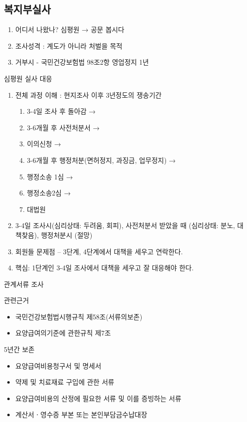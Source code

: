 \subsection{복지부실사}
\begin{enumerate}[1.]\tightlist
\item 어디서  나왔나?  심평원 → 공문 봅시다
\item 조사성격 : 계도가 아니라 처벌을 목적
\item 거부시 -  국민건강보험법 98조2항   영업정지 1년
\end{enumerate}
심평원 실사 대응
\begin{enumerate}[1.]\tightlist
\item 전체 과정 이해 : 현지조사 이후 3년정도의 쟁송기간
	\begin{enumerate}[⓵]\tightlist
	\item 3-4일 조사 후 돌아감 →
	\item 3-6개월 후 사전처분서 →
	\item 이의신청 →
	\item 3-6개월 후 행정처분(면허정지, 과징금, 업무정지) →
	\item 행정소송 1심 →
	\item 행정소송2심 →
	\item 대법원 
	\end{enumerate}
\item 3-4일 조사시(심리상태: 두려움, 회피), 사전처분서 받았을 때 (심리상태: 분노, 대책찾음), 행정처분시 (절망)
\item 회원들 문제점 – 3단계, 4단계에서 대책을 세우고 연락한다. 
\item 핵심: 1단계인 3-4일 조사에서 대책을 세우고 잘 대응해야 한다. 
\end{enumerate}
관계서류 조사
\begin{commentbox}{관련근거}
\begin{itemize}\tightlist
\item 국민건강보험법시행규칙 제58조(서류의보존)
\item 요양급여의기준에 관한규칙 제7조
\end{itemize}
\Large{5년간 보존}
\begin{itemize}\tightlist
\item 요양급여비용청구서 및 명세서
\item 약제 및 치료재료 구입에 관한 서류
\item 요양급여비용의 산정에 필요한 서류 및 이를 증빙하는 서류
\item 계산서ㆍ영수증 부본 또는 본인부담금수납대장
\end{itemize}
\end{commentbox}

